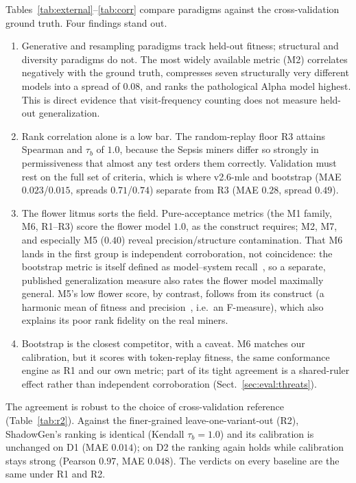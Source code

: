 \documentclass[runningheads]{llncs}
\begin{document}
Tables~\ref{tab:external}--\ref{tab:corr} compare paradigms against the cross-validation ground truth. Four findings stand out.
\begin{enumerate}
  \item Generative and resampling paradigms track held-out fitness; structural and diversity paradigms do not. The most widely available metric (M2) correlates negatively with the ground truth, compresses seven structurally very different models into a spread of $0.08$, and ranks the pathological Alpha model highest. This is direct evidence that visit-frequency counting does not measure held-out generalization.
  \item Rank correlation alone is a low bar. The random-replay floor R3 attains Spearman and $\tau_b$ of $1.0$, because the Sepsis miners differ so strongly in permissiveness that almost any test orders them correctly. Validation must rest on the full set of criteria, which is where v2.6-mle and bootstrap (MAE $0.023$/$0.015$, spreads $0.71$/$0.74$) separate from R3 (MAE $0.28$, spread $0.49$).
  \item The flower litmus sorts the field. Pure-acceptance metrics (the M1 family, M6, R1--R3) score the flower model $1.0$, as the construct requires; M2, M7, and especially M5 ($0.40$) reveal precision/structure contamination. That M6 lands in the first group is independent corroboration, not coincidence: the bootstrap metric is itself defined as model--system recall~\cite{polyvyanyy2022bootstrap}, so a separate, published generalization measure also rates the flower model maximally general. M5's low flower score, by contrast, follows from its construct (a harmonic mean of fitness and precision~\cite{theis2020avatar}, i.e.\ an F-measure), which also explains its poor rank fidelity on the real miners.
  \item Bootstrap is the closest competitor, with a caveat. M6 matches our calibration, but it scores with token-replay fitness, the same conformance engine as R1 and our own metric; part of its tight agreement is a shared-ruler effect rather than independent corroboration (Sect.~\ref{sec:eval:threats}).
\end{enumerate}

The agreement is robust to the choice of cross-validation reference (Table~\ref{tab:r2}). Against the finer-grained leave-one-variant-out (R2), ShadowGen's ranking is identical (Kendall $\tau_b{=}1.0$) and its calibration is unchanged on D1 (MAE $0.014$); on D2 the ranking again holds while calibration stays strong (Pearson $0.97$, MAE $0.048$). The verdicts on every baseline are the same under R1 and R2.
\end{document}
